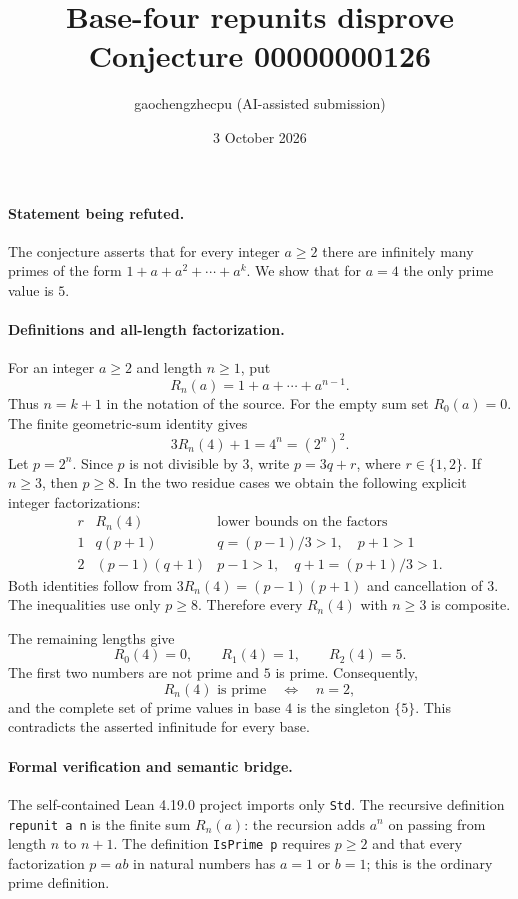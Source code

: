 \documentclass[11pt]{article}
\title{Base-four repunits disprove Conjecture 00000000126}
\author{gaochengzhecpu (AI-assisted submission)}
\date{3 October 2026}
\begin{document}
\maketitle

\paragraph{Statement being refuted.}
The conjecture asserts that for every integer $a\ge2$ there are infinitely many primes of the form
$1+a+a^2+\cdots+a^k$.
We show that for $a=4$ the only prime value is $5$.

\paragraph{Definitions and all-length factorization.}
For an integer $a\ge2$ and length $n\ge1$, put
\[
 R_n(a)=1+a+\cdots+a^{n-1}.
\]
Thus $n=k+1$ in the notation of the source. For the empty sum set $R_0(a)=0$.
The finite geometric-sum identity gives
\[
 3R_n(4)+1=4^n=(2^n)^2.
\]
Let $p=2^n$. Since $p$ is not divisible by $3$, write
$p=3q+r$, where $r\in\{1,2\}$. If $n\ge3$, then $p\ge8$.
In the two residue cases we obtain the following explicit integer factorizations:
\[
\begin{array}{c|c|c}
r & R_n(4) & \text{lower bounds on the factors}\\ \hline
1 & q(p+1) & q=(p-1)/3>1,\quad p+1>1\\
2 & (p-1)(q+1) & p-1>1,\quad q+1=(p+1)/3>1 .
\end{array}
\]
Both identities follow from
$3R_n(4)=(p-1)(p+1)$ and cancellation of $3$.
The inequalities use only $p\ge8$. Therefore every $R_n(4)$ with $n\ge3$ is composite.

The remaining lengths give
\[
R_0(4)=0,\qquad R_1(4)=1,\qquad R_2(4)=5.
\]
The first two numbers are not prime and $5$ is prime. Consequently,
\[
 R_n(4)\text{ is prime}\quad\Longleftrightarrow\quad n=2,
\]
and the complete set of prime values in base $4$ is the singleton $\{5\}$.
This contradicts the asserted infinitude for every base.

\newpage
\paragraph{Formal verification and semantic bridge.}
The self-contained Lean 4.19.0 project imports only \texttt{Std}.
The recursive definition \texttt{repunit a n} is the finite sum $R_n(a)$:
the recursion adds $a^n$ on passing from length $n$ to $n+1$.
The definition \texttt{IsPrime p} requires $p\ge2$ and that every factorization
$p=ab$ in natural numbers has $a=1$ or $b=1$; this is the ordinary prime definition.
\end{document}
